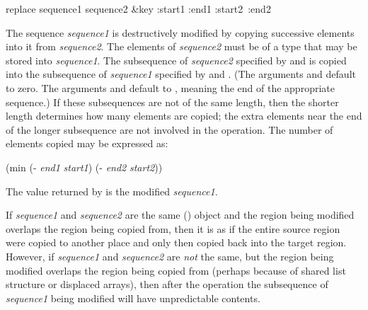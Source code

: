 \begin{defun}[Function]
replace sequence1 sequence2 &key :start1 :end1 :start2~:end2

The sequence {\it sequence1} is destructively modified by copying successive
elements into it from {\it sequence2}.  The elements of
{\it sequence2} must be of a type that may be stored into
{\it sequence1}.  The subsequence of {\it sequence2}
specified by  and  is copied into the
subsequence of {\it sequence1} specified by  and .
(The arguments  and  default to zero.
The arguments  and  default
to {\false}, meaning the end of the appropriate sequence.)
If these subsequences are not of the same length, then
the shorter length determines how many elements are copied; the extra
elements near the end of the longer subsequence are not involved in the
operation.
The number of elements copied may be expressed as:
\begin{lisp}
(min (- {\it end1} {\it start1}) (- {\it end2} {\it start2}))
\end{lisp}
The value returned by  is the modified {\it sequence1}.

If {\it sequence1} and {\it sequence2} are the same () object
and the region being modified overlaps the region being copied
from, then it is as if the entire source region were copied to another
place and only then copied back into the target region.
However, if {\it sequence1} and {\it sequence2} are {\it not} the same,
but the region being modified overlaps the region being copied from
(perhaps because of shared list structure or displaced arrays),
then after the  operation
the subsequence of {\it sequence1} being modified will have
unpredictable contents.
\end{defun}

